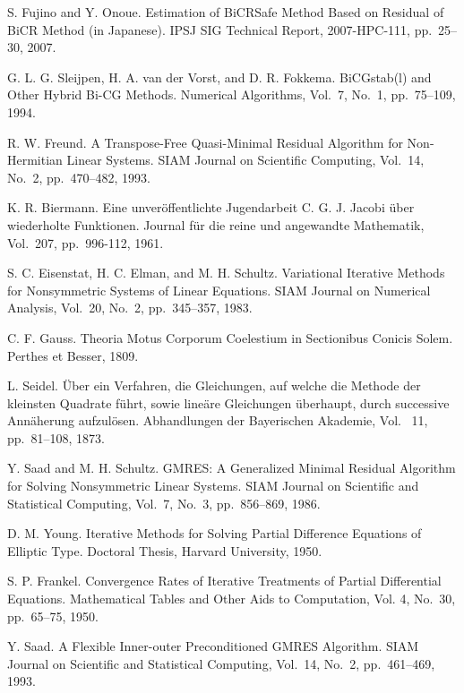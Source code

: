 \documentclass[a4paper]{article}
\begin{document}
\begin{thebibliography}{10}
S. Fujino and Y. Onoue.
\newblock Estimation of BiCRSafe Method Based on Residual of BiCR Method (in Japanese).
\newblock IPSJ SIG Technical Report, 2007-HPC-111, pp.\ 25--30, 2007.

G. L. G. Sleijpen, H. A. van der Vorst, and D. R. Fokkema.
\newblock BiCGstab(l) and Other Hybrid Bi-CG Methods.
\newblock Numerical Algorithms, Vol.~7, No.~1, pp.\ 75--109, 1994.

R. W. Freund.
\newblock A Transpose-Free Quasi-Minimal Residual Algorithm for
	Non-Hermitian Linear Systems.
\newblock SIAM Journal on Scientific Computing, Vol.~14, No.~2, pp.\ 470--482, 1993.

K. R. Biermann.
\newblock Eine unver\"offentlichte Jugendarbeit C. G. J. Jacobi \"uber
	wiederholte Funktionen.
\newblock Journal f\"ur die reine und angewandte Mathematik, Vol.~207, pp.\ 996-112, 1961.

S. C. Eisenstat, H. C. Elman, and M. H. Schultz.
\newblock Variational Iterative Methods for Nonsymmetric Systems of
	Linear Equations.
\newblock SIAM Journal on Numerical Analysis, Vol.~20, No.~2, pp.\ 345--357, 1983.

C. F. Gauss.
\newblock Theoria Motus Corporum Coelestium in Sectionibus Conicis Solem. 
\newblock Perthes et Besser, 1809.

L. Seidel.
\newblock \"Uber ein Verfahren, die Gleichungen, auf welche die Methode
	der kleinsten Quadrate f\"uhrt, sowie line\"are Gleichungen
	\"uberhaupt, durch successive Ann\"aherung  aufzul\"osen.
\newblock Abhandlungen der Bayerischen Akademie, Vol. ~11, pp.\ 81--108,
	1873.

Y. Saad and M. H. Schultz.
\newblock GMRES: A Generalized Minimal Residual Algorithm for Solving
	Nonsymmetric Linear Systems.
\newblock SIAM Journal on Scientific and Statistical Computing, Vol.~7, No.~3, pp.\ 856--869, 1986.

D. M. Young.
\newblock Iterative Methods for Solving Partial Difference Equations of
	Elliptic Type.
\newblock Doctoral Thesis, Harvard University, 1950.

S. P. Frankel.
\newblock Convergence Rates of Iterative Treatments of Partial
	Differential Equations.
\newblock Mathematical Tables and Other Aids to Computation, Vol. 4, No.~30, 
	pp.\ 65--75, 1950.

Y. Saad.
\newblock A Flexible Inner-outer Preconditioned GMRES Algorithm.
\newblock SIAM Journal on Scientific and Statistical Computing, Vol.~14, No.~2, pp.\ 461--469, 1993.


\end{thebibliography}
\end{document}
